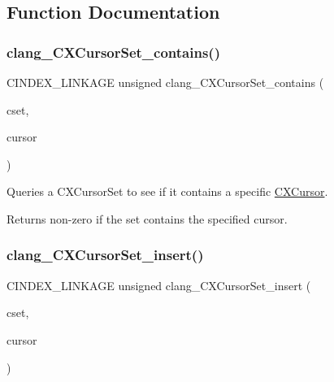 \subsection{Function Documentation}
\mbox{\label{group__CINDEX__CURSOR__MANIP_ga518db5daf2ca251e4ff983d9f4f7d75d}} 
\subsubsection{\texorpdfstring{clang\+\_\+\+C\+X\+Cursor\+Set\+\_\+contains()}{clang\_CXCursorSet\_contains()}}
{\footnotesize\ttfamily C\+I\+N\+D\+E\+X\+\_\+\+L\+I\+N\+K\+A\+GE unsigned clang\+\_\+\+C\+X\+Cursor\+Set\+\_\+contains (\begin{DoxyParamCaption}\item[{\hyperlink{group__CINDEX__CURSOR__MANIP_gacca741976831fc313f80970cbf88307d}{C\+X\+Cursor\+Set}}]{cset,  }\item[{\hyperlink{structCXCursor}{C\+X\+Cursor}}]{cursor }\end{DoxyParamCaption})}



Queries a C\+X\+Cursor\+Set to see if it contains a specific \hyperlink{structCXCursor}{C\+X\+Cursor}. 

\begin{DoxyReturn}{Returns}
non-\/zero if the set contains the specified cursor. 
\end{DoxyReturn}
\mbox{\label{group__CINDEX__CURSOR__MANIP_ga172e5a92c77da9609ad80baf08751dd1}} 
\subsubsection{\texorpdfstring{clang\+\_\+\+C\+X\+Cursor\+Set\+\_\+insert()}{clang\_CXCursorSet\_insert()}}
{\footnotesize\ttfamily C\+I\+N\+D\+E\+X\+\_\+\+L\+I\+N\+K\+A\+GE unsigned clang\+\_\+\+C\+X\+Cursor\+Set\+\_\+insert (\begin{DoxyParamCaption}\item[{\hyperlink{group__CINDEX__CURSOR__MANIP_gacca741976831fc313f80970cbf88307d}{C\+X\+Cursor\+Set}}]{cset,  }\item[{\hyperlink{structCXCursor}{C\+X\+Cursor}}]{cursor }\end{DoxyParamCaption})}



